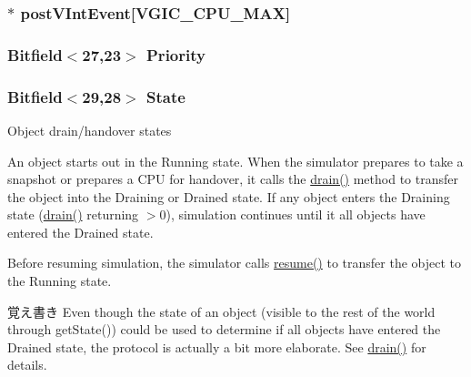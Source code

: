 \label{classVGic_a75b48f1787959a4617f2a599d7c09aab}
\hypertarget{classVGic_a391a6d3a21ceaa229791a17f58d2e0ae}{
\subsubsection[{postVIntEvent}]{$\ast$ {\bf postVIntEvent}\mbox{[}{\bf VGIC\_\-CPU\_\-MAX}\mbox{]}}}
\label{classVGic_a391a6d3a21ceaa229791a17f58d2e0ae}
\hypertarget{classVGic_a26c7f4132225aed6b8d4356c1601d689}{
\subsubsection[{Priority}]{\setlength{\rightskip}{0pt plus 5cm}Bitfield$<$27,23$>$ {\bf Priority}}}
\label{classVGic_a26c7f4132225aed6b8d4356c1601d689}
\hypertarget{classVGic_a4ad4e2a479baf0de8e8cdcb0c84276db}{
\subsubsection[{State}]{\setlength{\rightskip}{0pt plus 5cm}Bitfield$<$29,28$>$ {\bf State}}}
\label{classVGic_a4ad4e2a479baf0de8e8cdcb0c84276db}
Object drain/handover states

An object starts out in the Running state. When the simulator prepares to take a snapshot or prepares a CPU for handover, it calls the \hyperlink{classPioDevice_a6bf479c521c7c3eb473822d953275b26}{drain()} method to transfer the object into the Draining or Drained state. If any object enters the Draining state (\hyperlink{classPioDevice_a6bf479c521c7c3eb473822d953275b26}{drain()} returning $>$0), simulation continues until it all objects have entered the Drained state.

Before resuming simulation, the simulator calls \hyperlink{namespacem5_1_1simulate_a2985608bac11887a6ae3df9b068b10fe}{resume()} to transfer the object to the Running state.

\begin{DoxyNote}{覚え書き}
Even though the state of an object (visible to the rest of the world through getState()) could be used to determine if all objects have entered the Drained state, the protocol is actually a bit more elaborate. See \hyperlink{classPioDevice_a6bf479c521c7c3eb473822d953275b26}{drain()} for details. 
\end{DoxyNote}


